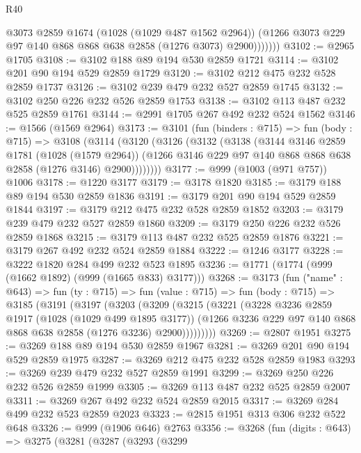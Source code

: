 \begin{lexlean}{R40}
\begin{coremodule}
                @3073
                @2859
                @1674
                (@1028 (@1029 @487 @1562 @2964))
                (@1266 @3073 @229 @97 @140 @868 @868 @638 @2858 (@1276 @3073) @2900)))))))
@3102 := @2965 @1705
@3108 := @3102 @188 @89 @194 @530 @2859 @1721
@3114 := @3102 @201 @90 @194 @529 @2859 @1729
@3120 := @3102 @212 @475 @232 @528 @2859 @1737
@3126 := @3102 @239 @479 @232 @527 @2859 @1745
@3132 := @3102 @250 @226 @232 @526 @2859 @1753
@3138 := @3102 @113 @487 @232 @525 @2859 @1761
@3144 := @2991 @1705 @267 @492 @232 @524 @1562
@3146 := @1566 (@1569 @2964)
@3173 := @3101
    (fun (binders : @715) =>
    fun (body : @715) =>
    @3108
      (@3114
        (@3120
          (@3126
            (@3132
              (@3138
                (@3144
                  @3146
                  @2859
                  @1781
                  (@1028 (@1579 @2964))
                  (@1266 @3146 @229 @97 @140 @868 @868 @638 @2858 (@1276 @3146) @2900))))))))
@3177 := @999 (@1003 (@971 @757)) @1006
@3178 := @1220 @3177
@3179 := @3178 @1820
@3185 := @3179 @188 @89 @194 @530 @2859 @1836
@3191 := @3179 @201 @90 @194 @529 @2859 @1844
@3197 := @3179 @212 @475 @232 @528 @2859 @1852
@3203 := @3179 @239 @479 @232 @527 @2859 @1860
@3209 := @3179 @250 @226 @232 @526 @2859 @1868
@3215 := @3179 @113 @487 @232 @525 @2859 @1876
@3221 := @3179 @267 @492 @232 @524 @2859 @1884
@3222 := @1246 @3177
@3228 := @3222 @1820 @284 @499 @232 @523 @1895
@3236 := @1771 (@1774 (@999 (@1662 @1892) (@999 (@1665 @833) @3177)))
@3268 := @3173
    (fun ("name" : @643) =>
    fun (ty : @715) =>
    fun (value : @715) =>
    fun (body : @715) =>
    @3185
      (@3191
        (@3197
          (@3203
            (@3209
              (@3215
                (@3221
                  (@3228
                    @3236
                    @2859
                    @1917
                    (@1028 (@1029 @499 @1895 @3177))
                    (@1266 @3236 @229 @97 @140 @868 @868 @638 @2858 (@1276 @3236) @2900)))))))))
@3269 := @2807 @1951
@3275 := @3269 @188 @89 @194 @530 @2859 @1967
@3281 := @3269 @201 @90 @194 @529 @2859 @1975
@3287 := @3269 @212 @475 @232 @528 @2859 @1983
@3293 := @3269 @239 @479 @232 @527 @2859 @1991
@3299 := @3269 @250 @226 @232 @526 @2859 @1999
@3305 := @3269 @113 @487 @232 @525 @2859 @2007
@3311 := @3269 @267 @492 @232 @524 @2859 @2015
@3317 := @3269 @284 @499 @232 @523 @2859 @2023
@3323 := @2815 @1951 @313 @306 @232 @522 @648
@3326 := @999 (@1906 @646) @2763
@3356 := @3268
    (fun (digits : @643) =>
    @3275
      (@3281
        (@3287
          (@3293
            (@3299

\end{coremodule}
\end{lexlean}
